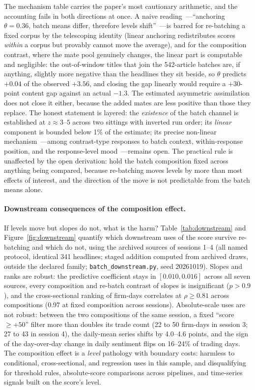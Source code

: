 The mechanism table carries the paper's most cautionary arithmetic, and the accounting fails in both directions at once. A naive reading~---``anchoring $\theta=0.36$, batch means differ, therefore levels shift''~---is barred for re-batching a fixed corpus by the telescoping identity (linear anchoring redistributes scores \emph{within} a corpus but provably cannot move the average), and for the composition contrast, where the mate pool genuinely changes, the linear part is computable and negligible: the out-of-window titles that join the 542-article batches are, if anything, slightly more negative than the headlines they sit beside, so $\theta$ predicts $+0.04$ of the observed $+3.56$, and closing the gap linearly would require a $+30$-point content gap against an actual $-1.3$. The estimated asymmetric assimilation does not close it either, because the added mates are less positive than those they replace. The honest statement is layered: the \emph{existence} of the batch channel is established at $z\approx3$--$5$ across two sittings with inverted run order; its \emph{linear} component is bounded below 1\% of the estimate; its precise non-linear mechanism~---among contrast-type responses to batch context, within-response position, and the response-level mood~---remains open. The practical rule is unaffected by the open derivation: hold the batch composition fixed across anything being compared, because re-batching moves levels by more than most effects of interest, and the direction of the move is not predictable from the batch means alone.

\paragraph{Downstream consequences of the composition effect.} If levels move but slopes do not, what is the harm? Table~\ref{tab:downstream} and Figure~\ref{fig:downstream} quantify which downstream uses of the score survive re-batching and which do not, using the archived sources of sessions 1--4 (all named protocol, identical 341 headlines; staged addition computed from archived draws, outside the declared family; \texttt{batch\_downstream.py}, seed 20261019). Slopes and ranks are robust: the predictive coefficient stays in $[0.010, 0.016]$ across all seven sources, every composition and re-batch contrast of slopes is insignificant ($p>0.9$), and the cross-sectional ranking of firm-days correlates at $\rho\geq 0.81$ across compositions (0.97 at fixed composition across sessions). Absolute-scale uses are not robust: between the two compositions of the same session, a fixed ``score $\geq +50$'' filter more than doubles its trade count (22 to 50 firm-days in session 3; 27 to 43 in session 4), the daily-mean series shifts by 4.0--4.6 points, and the sign of the day-over-day change in daily sentiment flips on 16--24\% of trading days. The composition effect is a \emph{level} pathology with boundary costs: harmless to conditional, cross-sectional, and regression uses in this sample, and disqualifying for threshold rules, absolute-score comparisons across pipelines, and time-series signals built on the score's level.

